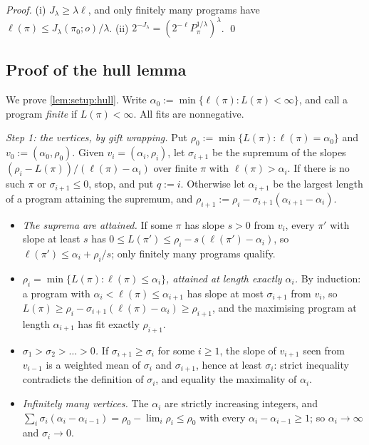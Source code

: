 \emph{Proof.} (i) $J_\lambda\ge\lambda\ell$, and only finitely many programs have $\ell(\pi)\le J_\lambda(\pi_0;o)/\lambda$. (ii) $2^{-J_\lambda}=(2^{-\ell}P_\pi^{1/\lambda})^\lambda$. \qed

\subsection{Proof of the hull lemma}\label{app:setup:hull}

We prove \cref{lem:setup:hull}. Write $\alpha_0:=\min\{\ell(\pi):L(\pi)<\infty\}$, and call a program \emph{finite} if $L(\pi)<\infty$. All fits are nonnegative.

\emph{Step 1: the vertices, by gift wrapping.} Put $\rho_0:=\min\{L(\pi):\ell(\pi)=\alpha_0\}$ and $v_0:=(\alpha_0,\rho_0)$. Given $v_i=(\alpha_i,\rho_i)$, let $\sigma_{i+1}$ be the supremum of the slopes $(\rho_i-L(\pi))/(\ell(\pi)-\alpha_i)$ over finite $\pi$ with $\ell(\pi)>\alpha_i$. If there is no such $\pi$ or $\sigma_{i+1}\le0$, stop, and put $q:=i$. Otherwise let $\alpha_{i+1}$ be the largest length of a program attaining the supremum, and $\rho_{i+1}:=\rho_i-\sigma_{i+1}(\alpha_{i+1}-\alpha_i)$.
\begin{itemize}[itemsep=0pt]
\item \emph{The suprema are attained.} If some $\pi$ has slope $s>0$ from $v_i$, every $\pi'$ with slope at least $s$ has $0\le L(\pi')\le\rho_i-s(\ell(\pi')-\alpha_i)$, so $\ell(\pi')\le\alpha_i+\rho_i/s$; only finitely many programs qualify.
\item \emph{$\rho_i=\min\{L(\pi):\ell(\pi)\le\alpha_i\}$, attained at length exactly $\alpha_i$.} By induction: a program with $\alpha_i<\ell(\pi)\le\alpha_{i+1}$ has slope at most $\sigma_{i+1}$ from $v_i$, so $L(\pi)\ge\rho_i-\sigma_{i+1}(\ell(\pi)-\alpha_i)\ge\rho_{i+1}$, and the maximising program at length $\alpha_{i+1}$ has fit exactly $\rho_{i+1}$.
\item \emph{$\sigma_1>\sigma_2>\dots>0$.} If $\sigma_{i+1}\ge\sigma_i$ for some $i\ge1$, the slope of $v_{i+1}$ seen from $v_{i-1}$ is a weighted mean of $\sigma_i$ and $\sigma_{i+1}$, hence at least $\sigma_i$: strict inequality contradicts the definition of $\sigma_i$, and equality the maximality of $\alpha_i$.
\item \emph{Infinitely many vertices.} The $\alpha_i$ are strictly increasing integers, and $\sum_i\sigma_i(\alpha_i-\alpha_{i-1})=\rho_0-\lim_i\rho_i\le\rho_0$ with every $\alpha_i-\alpha_{i-1}\ge1$; so $\alpha_i\to\infty$ and $\sigma_i\to0$.
\end{itemize}

